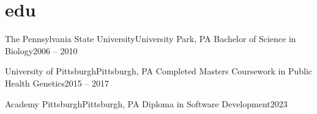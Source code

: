\section{edu}
\resumeSubHeadingListStart
  \resumeSubheading
    {The Pennsylvania State University}{University Park, PA}
    {Bachelor of Science in Biology}{2006 -- 2010}

  \resumeSubheading
    {University of Pittsburgh}{Pittsburgh, PA}
    {Completed Masters Coursework in Public Health Genetics}{2015 -- 2017}

  \resumeSubheading
    {Academy Pittsburgh}{Pittsburgh, PA}
    {Diploma in Software Development}{2023}
\resumeSubHeadingListEnd